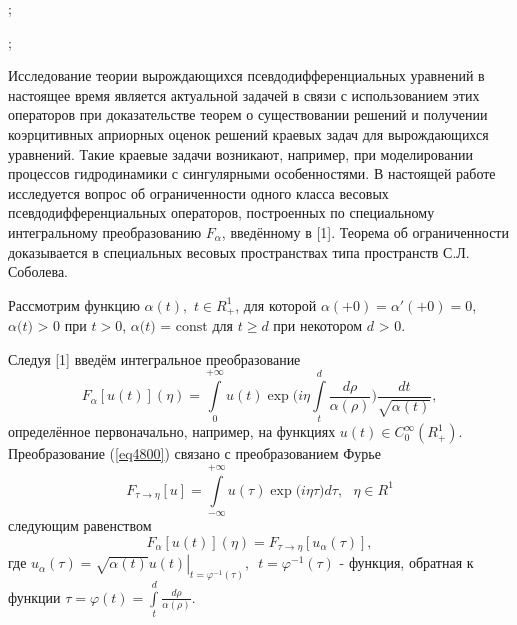 

; 


; 



Исследование теории вырождающихся псевдодифференциальных уравнений в
настоящее время является актуальной задачей в связи с использованием этих
операторов при доказательстве теорем о существовании решений и получении
коэрцитивных априорных оценок решений краевых задач для вырождающихся
уравнений. Такие краевые задачи возникают, например, при моделировании
процессов гидродинамики с сингулярными особенностями. В настоящей работе
исследуется вопрос об ограниченности одного класса весовых
псевдодифференциальных операторов, построенных по специальному интегральному
преобразованию $F_\alpha $, введённому в [1]. Теорема об ограниченности
доказывается в специальных весовых пространствах типа пространств С.Л.
Соболева.

Рассмотрим функцию $\alpha (t),\,\,t \in R_ + ^1 $, для которой $\alpha ( +
0) = {\alpha }'( + 0) = 0$, $\alpha \mbox{(}t\mbox{) > 0}$ при $t > 0$,
$\alpha \mbox{(}t\mbox{) = const}$ для $t \geqslant d$ при некотором $d\mbox{ >
0}$.

Следуя [1] введём интегральное преобразование
\begin{equation}
\label{eq4800}
F_\alpha [u(t)](\eta ) = \int\limits_0^{ + \infty } {u(t)\exp (i\eta }
\int\limits_t^d {\frac{d\rho }{\alpha (\rho )}} )\frac{dt}{\sqrt {\alpha
(t)} },
\end{equation}
определённое первоначально, например, на функциях $u(t) \in C_0^\infty (R_ +
^1 )$. Преобразование (\ref{eq4800}) связано с преобразованием Фурье
\[
F_{\tau \to \eta } [u] = \int\limits_{ - \infty }^{ + \infty } {u(\tau )\exp
(i\eta } \tau )d\tau ,\,\,\,\,\eta \in R^1
\]
следующим равенством
\[
F_\alpha [u(t)](\eta ) = F_{\tau \to \eta } [u_\alpha (\tau )],
\]
где $u_\alpha (\tau ) = \left. {\sqrt {\alpha (t)} u(t)} \right|_{t =
\varphi ^{ - 1}(\tau )} ,\,\,\,t = \varphi ^{ - 1}(\tau )$ - функция,
обратная к функции $\tau = \varphi (t) = \int\limits_t^d {\frac{d\rho
}{\alpha (\rho )}} .$


